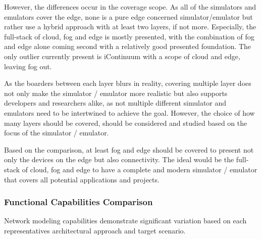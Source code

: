 However, the differences occur in the coverage scope.
As all of the simulators and emulators cover the edge, none is a pure edge concerned simulator/emulator but rather use a hybrid approach with at least two layers, if not more.
Especially, the full-stack of cloud, fog and edge is mostly presented, with the combination of fog and edge alone coming second with a relatively good presented foundation.
The only outlier currently present is iContinuum with a scope of cloud and edge, leaving fog out.

As the boarders between each layer blurs in reality, covering multiple layer does not only make the simulator / emulator more realistic but also supports developers and researchers alike, as not multiple different simulator and emulators need to be intertwined to achieve the goal.
However, the choice of how many layers should be covered, should be considered and studied based on the focus of the simulator / emulator.

Based on the comparison, at least fog and edge should be covered to present not only the devices on the edge but also connectivity. 
The ideal would be the full-stack of cloud, fog and edge to have a complete and modern simulator / emulator that covers all potential applications and projects.

\subsubsection{Functional Capabilities Comparison}
Network modeling capabilities demonstrate significant variation based on each representatives architectural approach and target scenario.

